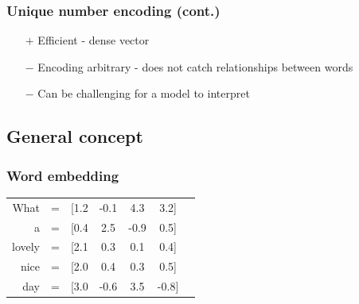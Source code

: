 

\begin{frame}
\frametitle{Unique number encoding (cont.)}

	\begin{itemize}
		\item[$+$] Efficient - dense vector
		\item[$-$] Encoding arbitrary - does not catch relationships between words
		\item[$-$] Can be challenging for a model to interpret
	\end{itemize}

\end{frame}


\subsection{General concept}


\begin{frame}
\frametitle{Word embedding}

\begin{table}[h]
	\hspace{15mm}
	\huge
	\begin{tabular}{rcccccc}
		What & = & [1.2 & -0.1 & 4.3 & 3.2] \\
		a & = & [0.4 & 2.5 & -0.9 & 0.5] \\
		lovely & = & [2.1 & 0.3 & 0.1& 0.4] \\
		nice & = & [2.0& 0.4& 0.3& 0.5] \\
		day & = & [3.0& -0.6& 3.5& -0.8] \\
	\end{tabular}
\end{table}



\end{frame}

